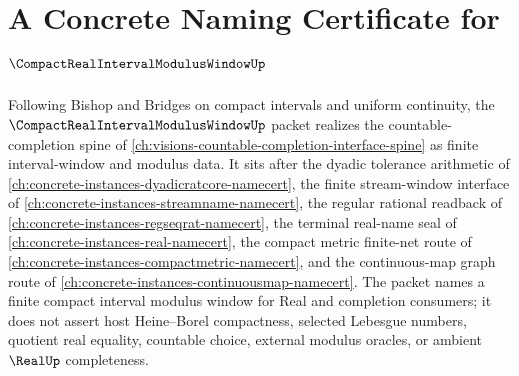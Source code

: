 \chapter{A Concrete Naming Certificate for $\CompactRealIntervalModulusWindowUp$}
\label{ch:concrete-instances-compact-real-interval-modulus-window-namecert}

Following Bishop and Bridges on compact intervals and uniform continuity, the $\CompactRealIntervalModulusWindowUp$ packet realizes the countable-completion spine of \autoref{ch:visions-countable-completion-interface-spine} as finite interval-window and modulus data. It sits after the dyadic tolerance arithmetic of \autoref{ch:concrete-instances-dyadicratcore-namecert}, the finite stream-window interface of \autoref{ch:concrete-instances-streamname-namecert}, the regular rational readback of \autoref{ch:concrete-instances-regseqrat-namecert}, the terminal real-name seal of \autoref{ch:concrete-instances-real-namecert}, the compact metric finite-net route of \autoref{ch:concrete-instances-compactmetric-namecert}, and the continuous-map graph route of \autoref{ch:concrete-instances-continuousmap-namecert}. The packet names a finite compact interval modulus window for Real and completion consumers; it does not assert host Heine--Borel compactness, selected Lebesgue numbers, quotient real equality, countable choice, external modulus oracles, or ambient $\RealUp$ completeness.

